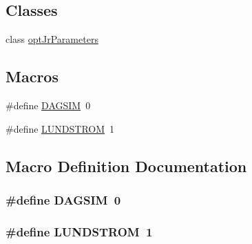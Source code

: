 \subsection*{Classes}
\begin{DoxyCompactItemize}
\item 
class \hyperlink{classoptJrParameters}{opt\-Jr\-Parameters}
\end{DoxyCompactItemize}
\subsection*{Macros}
\begin{DoxyCompactItemize}
\item 
\#define \hyperlink{optjrParameters_8hh_a56a8cb264c1d9cc7d95eec734118805b}{D\-A\-G\-S\-I\-M}~0
\item 
\#define \hyperlink{optjrParameters_8hh_a9dafe00da949db8c917f627d608b5c22}{L\-U\-N\-D\-S\-T\-R\-O\-M}~1
\end{DoxyCompactItemize}


\subsection{Macro Definition Documentation}
\hypertarget{optjrParameters_8hh_a56a8cb264c1d9cc7d95eec734118805b}{
\subsubsection[{D\-A\-G\-S\-I\-M}]{\setlength{\rightskip}{0pt plus 5cm}\#define D\-A\-G\-S\-I\-M~0}}\label{optjrParameters_8hh_a56a8cb264c1d9cc7d95eec734118805b}
\hypertarget{optjrParameters_8hh_a9dafe00da949db8c917f627d608b5c22}{
\subsubsection[{L\-U\-N\-D\-S\-T\-R\-O\-M}]{\setlength{\rightskip}{0pt plus 5cm}\#define L\-U\-N\-D\-S\-T\-R\-O\-M~1}}\label{optjrParameters_8hh_a9dafe00da949db8c917f627d608b5c22}
